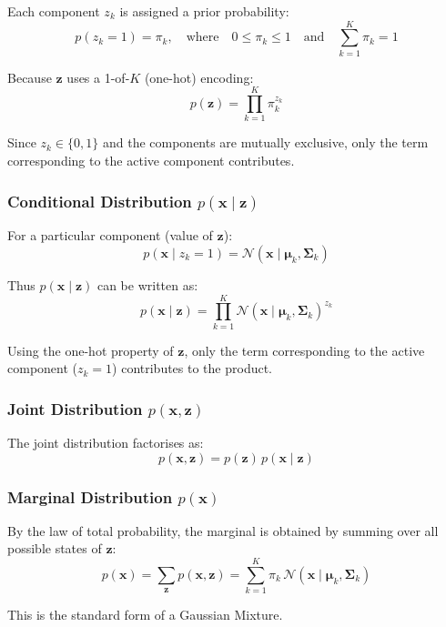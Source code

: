 \documentclass[11pt,a4paper]{article}
\theoremstyle{definition}
\theoremstyle{plain}
\theoremstyle{remark}
\begin{document}
Each component $z_k$ is assigned a prior probability:
\[
p(z_k = 1) = \pi_k, \quad \text{where} \quad 0 \leq \pi_k \leq 1 \quad \text{and} \quad \sum_{k=1}^{K} \pi_k = 1
\]

Because $\mathbf{z}$ uses a 1-of-$K$ (one-hot) encoding:
\[
p(\mathbf{z}) = \prod_{k=1}^{K} \pi_k^{z_k}
\]

Since $z_k \in \{0,1\}$ and the components are mutually exclusive, only the term corresponding to the active component contributes.

\subsubsection{Conditional Distribution $p(\mathbf{x} \mid \mathbf{z})$}

For a particular component (value of $\mathbf{z}$):
\[
p(\mathbf{x} \mid z_k = 1) = \mathcal{N}(\mathbf{x} \mid \boldsymbol{\mu}_k, \boldsymbol{\Sigma}_k)
\]

Thus $p(\mathbf{x} \mid \mathbf{z})$ can be written as:
\[
p(\mathbf{x} \mid \mathbf{z}) = \prod_{k=1}^{K} \mathcal{N}(\mathbf{x} \mid \boldsymbol{\mu}_k, \boldsymbol{\Sigma}_k)^{z_k}
\]

Using the one-hot property of $\mathbf{z}$, only the term corresponding to the active component ($z_k = 1$) contributes to the product.

\subsubsection{Joint Distribution $p(\mathbf{x}, \mathbf{z})$}

The joint distribution factorises as:
\[
p(\mathbf{x}, \mathbf{z}) = p(\mathbf{z}) \, p(\mathbf{x} \mid \mathbf{z})
\]

\subsubsection{Marginal Distribution $p(\mathbf{x})$}

By the law of total probability, the marginal is obtained by summing over all possible states of $\mathbf{z}$:
\[
p(\mathbf{x}) = \sum_{\mathbf{z}} p(\mathbf{x}, \mathbf{z}) = \sum_{k=1}^{K} \pi_k \, \mathcal{N}(\mathbf{x} \mid \boldsymbol{\mu}_k, \boldsymbol{\Sigma}_k)
\]

This is the standard form of a Gaussian Mixture.
\end{document}
